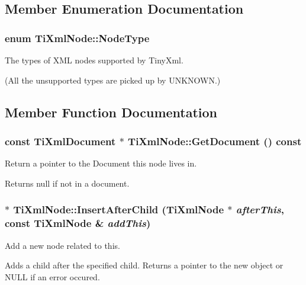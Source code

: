 \subsection{Member Enumeration Documentation}
\subsubsection{\setlength{\rightskip}{0pt plus 5cm}enum {\bf Ti\-Xml\-Node::Node\-Type}\hspace{0.3cm}{\tt  [inherited]}}\label{classTiXmlNode_TiXmlUnknownw7}


The types of XML nodes supported by Tiny\-Xml. 

(All the unsupported types are picked up by UNKNOWN.)

\subsection{Member Function Documentation}
\subsubsection{\setlength{\rightskip}{0pt plus 5cm}const {\bf Ti\-Xml\-Document} $\ast$ Ti\-Xml\-Node::Get\-Document () const\hspace{0.3cm}{\tt  [inherited]}}\label{classTiXmlNode_TiXmlUnknowna63}


Return a pointer to the Document this node lives in. 

Returns null if not in a document.
\subsubsection{ $\ast$ Ti\-Xml\-Node::Insert\-After\-Child ({\bf Ti\-Xml\-Node} $\ast$ {\em after\-This}, const {\bf Ti\-Xml\-Node} \& {\em add\-This})\hspace{0.3cm}{\tt  [inherited]}}\label{classTiXmlNode_TiXmlUnknowna35}


Add a new node related to this. 

Adds a child after the specified child. Returns a pointer to the new object or NULL if an error occured.
